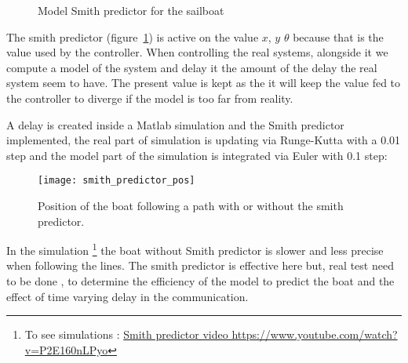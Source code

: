 \begin{figure}[H]
\centering
{} %
{

}
\caption{Model Smith predictor for the sailboat}
\label{fig:smith_pred}
\end{figure}

The smith predictor (figure~\ref{fig:smith_pred}) is active on the value $x$, $y$ $\theta$  because  that is the value used by the controller. When controlling the real systems, alongside it we compute a model of the system and delay it the amount of the delay the real system seem to have. The present value is kept as the it will keep the value fed to the controller to diverge if the model is too far from reality.

A delay is created inside a Matlab simulation and the Smith predictor implemented, the real part of simulation is updating via Runge-Kutta with a 0.01 step and the model part of the simulation is integrated via Euler with 0.1 step:

\begin{figure}[H]
\centering
    \texttt{[image: smith\_predictor\_pos]}
    \caption{Position of the boat following a path with or without the smith predictor.}
    \label{fig:smith_predictor_pos}
\end{figure}


In the simulation \footnote{To see simulations : \href{https://www.youtube.com/watch?v=P2E160nLPyo}{Smith predictor video https://www.youtube.com/watch?v=P2E160nLPyo}} the boat without Smith predictor is slower and less precise when following the lines.
The smith predictor is effective here but, real test need to be done , to determine the efficiency of the model to predict the boat and the effect of time varying delay in the communication.

